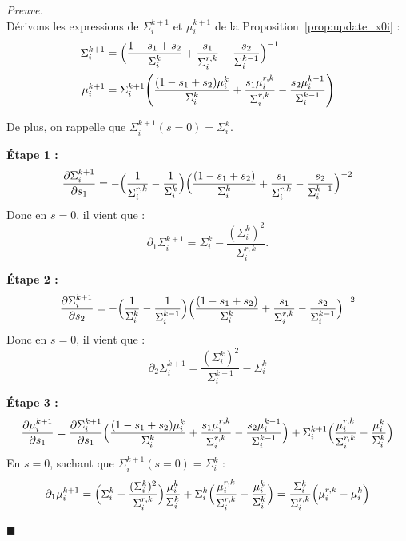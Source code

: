 \documentclass[12pt]{article}
\renewcommand{\qedsymbol}{$\blacksquare$}
\renewenvironment{proof}[1][\proofname]{%
  \par\medskip\noindent
  \textit{\color{proofgray}#1.}\enspace\ignorespaces
}{\hfill\qedsymbol\par\medskip}
\renewcommand{\proofname}{Preuve}
\begin{document}
\begin{proof}\\
Dérivons les expressions de $\Sigma_i^{k+1}$ et $\mu_i^{k+1}$ de la Proposition~\ref{prop:update_x0i} : \\

\begin{equation*}
\begin{aligned}
   \Sigma_i^{k+1} &= \Bigl( \frac{1-s_1+s_2}{\Sigma_i^{k}} + \frac{s_1}{\Sigma_i^{r,k}} - \frac{s_2}{\Sigma_i^{k-1}}  \Bigr)^{-1} \\
    \mu_i^{k+1} &= \Sigma_i^{k+1} \Biggl( \frac{(1-s_1+s_2)\mu_i^k}{\Sigma_i^{k}} + \frac{s_1\mu_i^{r,k}}{\Sigma_i^{r,k}} - \frac{s_2\mu_i^{k-1}}{\Sigma_i^{k-1}} \Biggr)
\end{aligned}
\end{equation*}

De plus, on rappelle que $\Sigma_i^{k+1}(s=0) = \Sigma_i^k$.

\medskip
\noindent\textbf{Étape 1 :}
\begin{equation*}
\frac{\partial \Sigma_i^{k+1}}{\partial s_1} = - \Bigl(\frac{1}{\Sigma_i^{r,k} } - \frac{1}{\Sigma_i^k}\Bigr) \Bigl( \frac{(1-s_1+s_2)}{\Sigma_i^{k}} + \frac{s_1}{\Sigma_i^{r,k}} - \frac{s_2}{\Sigma_i^{k-1}} \Bigr)^{-2}
\end{equation*}
Donc en $s=0$, il vient que :
\begin{equation*}
\partial_1 \Sigma_i^{k+1} =  \Sigma_i^k - \frac{(\Sigma_i^k)^2}{\Sigma_i^{r,k}}.
\end{equation*}

\noindent\textbf{Étape 2 :}
\begin{equation*}
\frac{\partial \Sigma_i^{k+1}}{\partial s_2} = - \Bigl(\frac{1}{\Sigma_i^{k} } - \frac{1}{\Sigma_i^{k-1}}\Bigr) \Bigl( \frac{(1-s_1+s_2)}{\Sigma_i^{k}} + \frac{s_1}{\Sigma_i^{r,k}} - \frac{s_2}{\Sigma_i^{k-1}} \Bigr)^{-2}
\end{equation*}
Donc en $s=0$, il vient que :
\begin{equation*}
\partial_2 \Sigma_i^{k+1} = \frac{(\Sigma_i^k)^2}{\Sigma_i^{k-1}} - \Sigma_i^k
\end{equation*}

\noindent\textbf{Étape 3 :}
\begin{equation*}
\frac{\partial \mu_i^{k+1}}{\partial s_1} = \frac{\partial \Sigma_i^{k+1}}{\partial s_1} \Bigl( 
    \frac{(1-s_1+s_2)\mu_i^k}{\Sigma_i^{k}} + \frac{s_1\mu_i^{r,k}}{\Sigma_i^{r,k}} - \frac{s_2\mu_i^{k-1}}{\Sigma_i^{k-1}} \Bigr) 
    + \Sigma_i^{k+1} \Bigl( 
        \frac{\mu_i^{r,k}}{\Sigma_i^{r,k}} - \frac{\mu_i^{k}}{\Sigma_i^{k}}
    \Bigr)
\end{equation*}
En $s=0$, sachant que $\Sigma_i^{k+1}(s=0)= \Sigma_i^k$ :
\begin{equation*}
\partial_1 \mu_i^{k+1} = \Bigl( \Sigma_i^{k} - \frac{(\Sigma_i^k)^2}{\Sigma_i^{r,k}}\Bigr)\frac{\mu_i^k}{\Sigma_i^k} + \Sigma_i^k\Bigl( \frac{\mu_i^{r,k}}{\Sigma_i^{r,k}} - \frac{\mu_i^k}{\Sigma_i^k}\Bigr) = \frac{\Sigma_i^k}{\Sigma_i^{r,k}} \Bigl( 
    \mu_i^{r,k} - \mu_i^k
\Bigr)
\end{equation*}


\end{proof}
\end{document}
